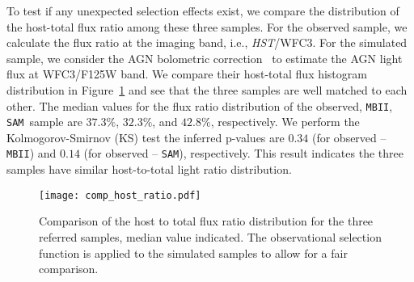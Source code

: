 \documentclass{natureprintstyle}
\newcommand{\hst}{{\it HST}}
\newcommand{\sam}{\texttt{SAM}}
\newcommand{\mbii}{\texttt{MBII}}
\begin{document}

To test if any unexpected selection effects exist, we compare the distribution of the host-total flux ratio among these three samples. For the observed sample, we calculate the flux ratio at the imaging band, i.e., \hst/WFC3. For the simulated sample, we consider the AGN bolometric correction~\cite{Elvis1994} to estimate the AGN light flux at WFC3/F125W band. We compare their host-total flux histogram distribution in Figure~\ref{fig:comp_hist} and see that the three samples are well matched to each other. The median values for the flux ratio distribution of the observed, \mbii, \sam\ sample are $37.3\%$, $32.3\%$, and $42.8\%$, respectively. We perform the Kolmogorov-Smirnov (KS) test the inferred p-values are $0.34$ (for observed -- \mbii) and $0.14$ (for observed -- \sam), respectively. This result indicates the three samples have similar host-to-total light ratio distribution.

\begin{figure}[t]
\texttt{[image: comp\_host\_ratio.pdf]}
\caption{Comparison of the host to total flux ratio distribution for the three referred samples, median value indicated. The observational selection function is applied to the simulated samples to allow for a fair comparison.
}
\label{fig:comp_hist}
\end{figure}
\end{document}
